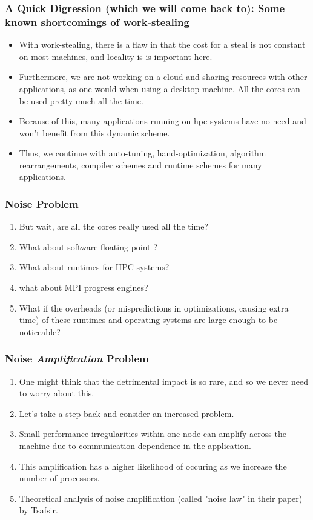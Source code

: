 \begin{frame} 
\frametitle{A Quick Digression (which we will come back to): Some known shortcomings of work-stealing}
\begin{itemize}
\item With work-stealing, there is a flaw in that the cost for 
a steal is not constant on most machines, and locality is 
is important here. 
\item Furthermore, we are not working on a cloud and sharing resources with other applications, 
as one would when using a desktop machine.  All the cores can be used pretty much all the time.
\item  Because of this, many applications running 
on hpc systems have no need and won't benefit from this dynamic scheme. 
\item Thus, we continue with auto-tuning, hand-optimization, algorithm rearrangements, 
compiler schemes and runtime schemes for many applications. 
\end{itemize}
\end{frame}

\begin{frame}
\frametitle{Noise Problem}
\begin{enumerate}  
\item But wait, are all the cores really used all the time? 
\item What about software floating point ?  
\item What about runtimes for HPC systems? 
\item what about MPI progress engines? 
\item What if the overheads (or mispredictions in optimizations, causing extra time) 
of these runtimes and operating systems 
are large enough to be noticeable?  
\end{enumerate} 
\end{frame} 


\begin{frame} 
\frametitle{Noise \textit{Amplification} Problem}
\begin{enumerate} 
\item \small One might think that the detrimental impact is so rare, and so we never need to worry about this. 
\item \small Let's take a step back and consider an increased problem. 
\item \small Small performance irregularities within one node can amplify across the machine 
due to communication dependence in the application.
\item \small This amplification has a higher likelihood of occuring as we increase the number of processors.  
\item \small Theoretical analysis of noise amplification (called "noise law" in their paper) by Tsafsir. 
\end{enumerate} 
\end{frame} 


